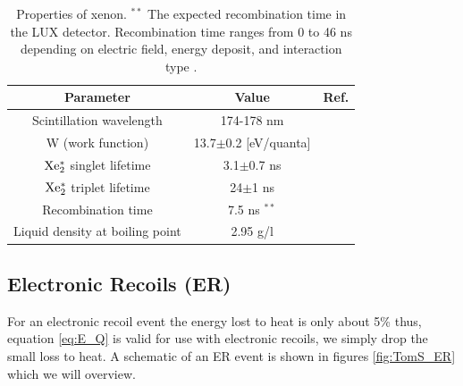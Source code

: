 \renewcommand{\baselinestretch}{1}
\small\normalsize
\begin{table}[h!]
\begin{center}
\begin{tabular}{|c|c|c|}
\hline
Parameter & Value & Ref.\\ \hline
Scintillation wavelength		& 174-178 nm 		&  \cite{Doke_Scintillation} \\ \hline
W (work function)				& 13.7$\pm$0.2 [eV/quanta]	&  \cite{Dahl_Thesis} \\ \hline
$\rm Xe^*_2$	singlet lifetime	& 3.1$\pm$0.7 ns			& \cite{Xe_singlet_tripplet_lifetime} \cite{Xe_Recombination_Time}  \cite{Recomb_Time_NEST}\\ \hline
$\rm Xe^*_2 $ triplet lifetime 	& 24$\pm$1 ns			&  \cite{Xe_singlet_tripplet_lifetime} \cite{Xe_Recombination_Time}  \cite{Recomb_Time_NEST}\\ \hline
Recombination time 			& 7.5 ns $^{**}$			 & \cite{Recomb_Time_Extraction} \cite{Recomb_Time_NEST}\\ \hline
Liquid density at boiling point	& 2.95 g/l 					& \cite{Xe_Density} \\ \hline
\end{tabular}
\caption{Properties of xenon. $^{**}$ The expected recombination time in the LUX detector. Recombination time ranges from 0 to 46 ns depending on electric field, energy deposit, and interaction type \cite{Recomb_Time_NEST} \cite{Recomb_Time_Extraction}.}
\label{table:Xe_Properties}
\end{center}
\end{table}
\renewcommand{\baselinestretch}{2}
\small\normalsize


\subsection{Electronic Recoils (ER)}
For an electronic recoil event the energy lost to heat is only about 5\% \cite{FanoTheoretical} thus, equation \ref{eq:E_Q} is valid for use with electronic recoils, we simply drop the small loss to heat. A schematic of an ER event is shown in figures \ref{fig:TomS_ER} which we will overview.

